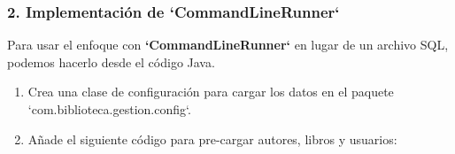 \documentclass[11pt]{article}
\begin{document}
\subsubsection{2. Implementación de `CommandLineRunner`}
\label{sec:org0bda98a}

Para usar el enfoque con \textbf{\textbf{`CommandLineRunner`}} en lugar de un archivo SQL, podemos hacerlo desde el código Java.

\begin{enumerate}
\item Crea una clase de configuración para cargar los datos en el paquete `com.biblioteca.gestion.config`.

\item Añade el siguiente código para pre-cargar autores, libros y usuarios:
\end{enumerate}
\end{document}
